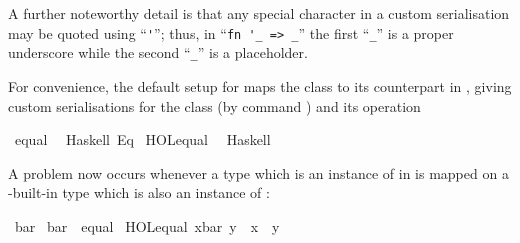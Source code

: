 \begin{isabellebody}
\begin{isamarkuptext}
  A further noteworthy detail is that any special character in a
  custom serialisation may be quoted using ``\verb|'|''; thus,
  in ``\verb|fn '_ => _|'' the first ``\verb|_|'' is a
  proper underscore while the second ``\verb|_|'' is a
  placeholder.%
\end{isamarkuptext}%
\isamarkuptrue%
%
\isamarkuptrue%
%
\begin{isamarkuptext}%
For convenience, the default  setup for 
  maps the  class to its counterpart in ,
  giving custom serialisations for the class  (by command
  \hypertarget{command.code-class}{\hyperlink{command.code-class}{\mbox{}}}) and its operation %
\end{isamarkuptext}%
\isamarkuptrue%
%
\isadelimquotett
%
\endisadelimquotett
%
\isatagquotett
{}\isamarkupfalse%
\ equal\isanewline
\ \ {}Haskell\ {}Eq{}{}\isanewline
\isanewline
{}\isamarkupfalse%
\ {}HOL{}equal{}\isanewline
\ \ {}Haskell\ \ {}\ {}{}{}{}{}%
\endisatagquotett
{\isafoldquotett}%
%
\isadelimquotett
%
\endisadelimquotett
%
\begin{isamarkuptext}%
\noindent A problem now occurs whenever a type which is an instance
  of  in  is mapped on a -built-in type which is also an instance of 
  :%
\end{isamarkuptext}%
\isamarkuptrue%
%
\isadelimquote
%
\endisadelimquote
%
\isatagquote
{}\isamarkupfalse%
\ bar\isanewline
\isanewline
{}\isamarkupfalse%
\ bar\ {}{}\ equal\isanewline
{}\isanewline
\isanewline
{}\isamarkupfalse%
\ {}HOL{}equal\ {}x{}bar{}\ y\ {}\ x\ {}\ y{}\isanewline

\end{isabellebody}
